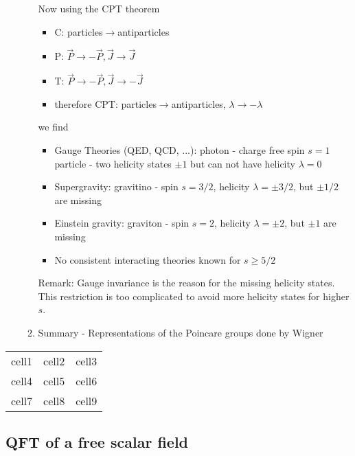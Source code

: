 \documentclass[10pt,a4paper]{book}
\theoremstyle{definition}
\begin{document}
\begin{itemize}
\begin{enumerate}
Now using the CPT theorem
\begin{itemize}
\item C: particles$\rightarrow$antiparticles
\item P: $\vec{P}\rightarrow-\vec{P},\vec{J}\rightarrow\vec{J}$
\item T: $\vec{P}\rightarrow-\vec{P},\vec{J}\rightarrow-\vec{J}$
\item therefore CPT: particles$\rightarrow$antiparticles, $\lambda\rightarrow-\lambda$
\end{itemize}
we find 
\begin{itemize}
\item Gauge Theories (QED, QCD, ...): photon - charge free spin $s=1$  particle - two helicity states $\pm1$ but can not have helicity $\lambda=0$
\item Supergravity: gravitino - spin $s=3/2$, helicity $\lambda=\pm3/2$, but $\pm1/2$ are missing
\item Einstein gravity: graviton - spin $s=2$, helicity $\lambda=\pm2$, but $\pm1$ are missing
\item No consistent interacting theories known for $s\ge5/2$
\end{itemize}
Remark: Gauge invariance is the reason for the missing helicity states. This restriction is too complicated to avoid more helicity states for higher $s$.
\item Summary - Representations of the Poincare groups done by Wigner
\end{enumerate}
\end{itemize}



\begin{center}
\begin{tabular}{ c c c }
 cell1 & cell2 & cell3 \\ 
 cell4 & cell5 & cell6 \\  
 cell7 & cell8 & cell9    
\end{tabular}
\end{center}

\subsection{QFT of a free scalar field}

\newpage
\end{document}
